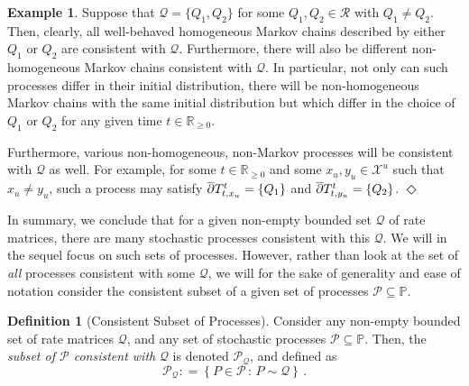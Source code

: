 \documentclass[10pt]{paper}
\theoremstyle{definition}
\newtheorem{exmp}{Example}%
\newtheorem{definition}{Definition}
\newcommand{\reals}{\mathbb{R}}
\newcommand{\realsnonneg}{\reals_{\geq 0}}
\newcommand{\states}{\mathcal{X}}
\newcommand{\processes}{\mathbb{P}}
\newcommand{\rateset}{\mathcal{Q}}
\newcommand{\coloneqq}{:\!=}
\newcommand{\exampleend}{\hfill$\Diamond$}
\begin{document}
\begin{exmp}
Suppose that $\rateset=\{Q_1,Q_2\}$ for some $Q_1,Q_2\in\mathcal{R}$ with $Q_1\neq Q_2$. Then, clearly, all well-behaved homogeneous Markov chains described by either $Q_1$ or $Q_2$ are consistent with $\rateset$. Furthermore, there will also be different non-homogeneous Markov chains consistent with $\rateset$. In particular, not only can such processes differ in their initial distribution, there will be non-homogeneous Markov chains with the same initial distribution but which differ in the choice of $Q_1$ or $Q_2$ for any given time $t\in\realsnonneg$. 

Furthermore, various non-homogeneous, non-Markov processes will be consistent with $\rateset$ as well. For example, for some $t\in\realsnonneg$ and some $x_u,y_u\in\states^u$ such that $x_u\neq y_u$, such a process may satisfy $\smash{\overline{\partial}}T_{t,x_u}^t=\{Q_1\}$ and $\smash{\overline{\partial}}T_{t,y_u}^t=\{Q_2\}$.
\exampleend
\end{exmp}

In summary, we conclude that for a given non-empty bounded set $\rateset$ of rate matrices, there are many stochastic processes consistent with this $\rateset$. We will in the sequel focus on such sets of processes. However, rather than look at the set of \emph{all} processes consistent with some $\rateset$, we will for the sake of generality and ease of notation consider the consistent subset of a given set of processes $\mathcal{P}\subseteq\processes$.


\begin{definition}[Consistent Subset of Processes]\label{def:consistent_process_set}
Consider any non-empty bounded set of rate matrices $\rateset$, and any set of stochastic processes $\mathcal{P}\subseteq\processes$. Then, the \emph{subset of $\mathcal{P}$ consistent with} $\rateset$ is denoted $\mathcal{P}_\rateset$, and defined as
\begin{equation*}
\mathcal{P}_{\rateset} \coloneqq \left\{P\in\mathcal{P}\,:\,P\sim\rateset\right\}\,.
\end{equation*}
\end{definition}
\end{document}
